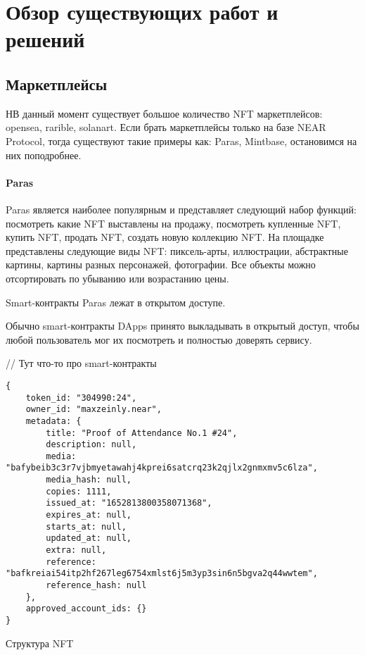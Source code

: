 \section{Обзор существующих работ и решений}
\label{section.3}
\subsection{Маркетплейсы}
НВ данный момент существует большое количество NFT маркетплейсов: opensea\cite{opensea}, rarible\cite{rarible}, solanart\cite{solanart}. Если брать маркетплейсы только на базе NEAR Protocol, тогда существуют такие примеры как: Paras\cite{paras}, Mintbase\cite{mintbase}, остановимся на них поподробнее.

\paragraph{Paras}

Paras является наиболее популярным и представляет следующий набор функций:
посмотреть какие NFT выставлены на продажу, посмотреть купленные NFT, купить NFT, продать NFT, создать новую коллекцию NFT.
На площадке представлены следующие виды NFT: пиксель-арты, иллюстрации, абстрактные картины, картины разных персонажей, фотографии. Все объекты можно отсортировать по убыванию или возрастанию цены.

Smart-контракты Paras лежат в открытом доступе\cite{parasnftcontract, parasmarketplacecontract}.

\begin{remark}
    Обычно smart-контракты DApps принято выкладывать в открытый доступ, чтобы любой пользователь мог их посмотреть и полностью доверять сервису.
\end{remark}

// Тут что-то про smart-контракты

\begin{listing}
\begin{verbatim}
{
    token_id: "304990:24",
    owner_id: "maxzeinly.near",
    metadata: {
        title: "Proof of Attendance No.1 #24",
        description: null,
        media: "bafybeib3c3r7vjbmyetawahj4kprei6satcrq23k2qjlx2gnmxmv5c6lza",
        media_hash: null,
        copies: 1111,
        issued_at: "1652813800358071368",
        expires_at: null,
        starts_at: null,
        updated_at: null,
        extra: null,
        reference: "bafkreiai54itp2hf267leg6754xmlst6j5m3yp3sin6n5bgva2q44wwtem",
        reference_hash: null
    },
    approved_account_ids: {}
}
\end{verbatim}
\caption{Структура NFT}
\end{listing}

